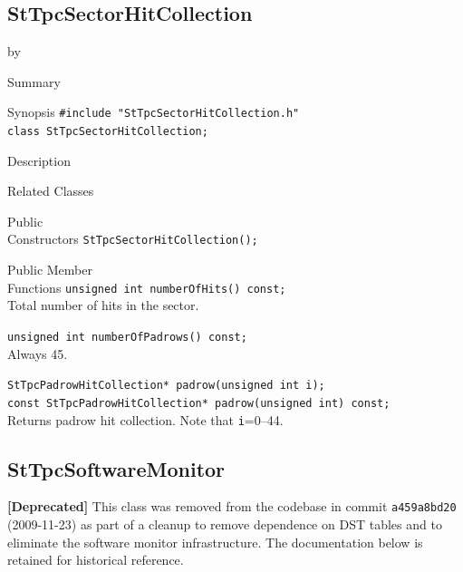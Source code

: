 \documentclass[twoside]{article}
\newcommand{\entrylabel}[1]{\mbox{\textbf{{#1}}}\hfil}%
\newenvironment{entry}
{\begin{list}{}%
    {\renewcommand{\makelabel}{\entrylabel}%
     \setlength{\labelwidth}{90pt}%
     \setlength{\leftmargin}{\labelwidth}
     \advance\leftmargin by \labelsep%
      }%
    }%
  {\end{list}}
\newcommand{\Entrylabel}[1]%
{\raisebox{0pt}[1ex][0pt]{\makebox[\labelwidth][l]%
    {\parbox[t]{\labelwidth}{\hspace{0pt}\textbf{{#1}}}}}}
\newenvironment{Entry}%
{\renewcommand{\entrylabel}{\Entrylabel}\begin{entry}}%
  {\end{entry}}
\begin{document}
\subsection{StTpcSectorHitCollection}
\label{sec:StTpcSectorHitCollection}
\begin{Entry}
\item[Summary]
\item[Synopsis]
    \verb+#include "StTpcSectorHitCollection.h"+\\
    \verb+class StTpcSectorHitCollection;+\\
\item[Description]
\item[Related Classes]
\item[Public\\ Constructors]
    \verb+StTpcSectorHitCollection();+\\
\item[Public Member\\ Functions]
    \verb+unsigned int numberOfHits() const;+\\
    Total number of hits in the sector.
    
    \verb+unsigned int numberOfPadrows() const;+\\
    Always 45.
    
    \verb+StTpcPadrowHitCollection* padrow(unsigned int i);+\\
    \verb+const StTpcPadrowHitCollection* padrow(unsigned int) const;+\\
    Returns padrow hit collection. Note that \texttt{i}=0--44.
    
\end{Entry}
\clearpage


\subsection{StTpcSoftwareMonitor}
\label{sec:StTpcSoftwareMonitor}
\textbf{[Deprecated]} This class was removed from the codebase in commit
\texttt{a459a8bd20} (2009-11-23) as part of a cleanup to remove dependence on
DST tables and to eliminate the software monitor infrastructure.
The documentation below is retained for historical reference.
\end{document}
